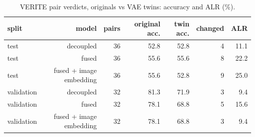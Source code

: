 \begin{table}[t]
\centering
\caption{VERITE pair verdicts, originals vs VAE twins: accuracy and ALR (\%).}
\label{tab:tab_leakage}
\begin{tabular}{lrrrrrr}
\toprule
split & model & pairs & original acc. & twin acc. & changed & ALR \\
\midrule
test & decoupled & 36 & 52.8 & 52.8 & 4 & 11.1 \\
test & fused & 36 & 55.6 & 55.6 & 8 & 22.2 \\
test & fused + image embedding & 36 & 55.6 & 52.8 & 9 & 25.0 \\
validation & decoupled & 32 & 81.3 & 71.9 & 3 & 9.4 \\
validation & fused & 32 & 78.1 & 68.8 & 5 & 15.6 \\
validation & fused + image embedding & 32 & 78.1 & 68.8 & 3 & 9.4 \\
\bottomrule
\end{tabular}
\end{table}

